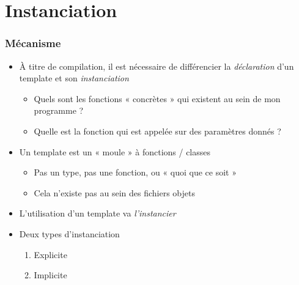 \section{Instanciation}

\begin{frame}
\frametitle{Mécanisme}
\begin{itemize}[<+->]
\item À titre de compilation, il est nécessaire de différencier la \emph{déclaration} d'un template et son \emph{instanciation}
	\begin{itemize}
	\item Quels sont les fonctions « concrètes » qui existent au sein de mon programme ?
	\item Quelle est la fonction qui est appelée sur des paramètres donnés ?
	\end{itemize}
\item Un template est un « moule » à fonctions / classes
	\begin{itemize}
	\item Pas un type, pas une fonction, ou « quoi que ce soit »
	\item Cela n'existe pas au sein des fichiers objets
	\end{itemize}
\item L'utilisation d'un template va \emph{l'instancier }
\item Deux types d'instanciation
	\begin{enumerate}
	\item Explicite
	\item Implicite
	\end{enumerate}
\end{itemize}
\end{frame}

